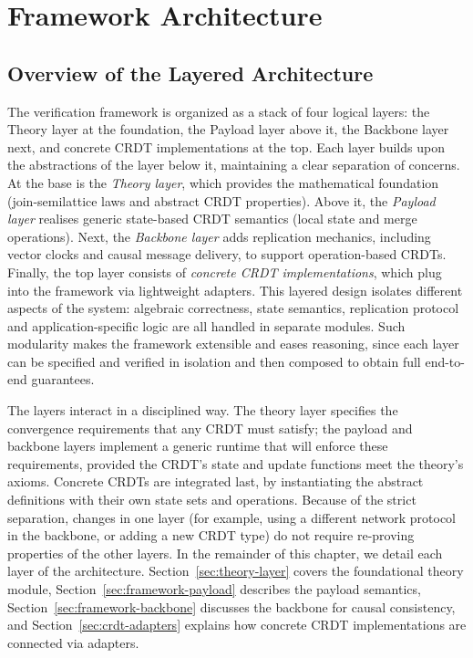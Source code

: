 
\chapter{Framework Architecture}\label{chap:framework}


\section{Overview of the Layered Architecture}

The verification framework is organized as a stack of four logical layers: the Theory layer at the foundation, the Payload layer above it, the Backbone layer next, and concrete CRDT implementations at the top. Each layer builds upon the abstractions of the layer below it, maintaining a clear separation of concerns. At the base is the \emph{Theory layer}, which provides the mathematical foundation (join-semilattice laws and abstract CRDT properties). Above it, the \emph{Payload layer} realises generic state-based CRDT semantics (local state and merge operations). Next, the \emph{Backbone layer} adds replication mechanics, including vector clocks and causal message delivery, to support operation-based CRDTs. Finally, the top layer consists of \emph{concrete CRDT implementations}, which plug into the framework via lightweight adapters. This layered design isolates different aspects of the system: algebraic correctness, state semantics, replication protocol and application-specific logic are all handled in separate modules. Such modularity makes the framework extensible and eases reasoning, since each layer can be specified and verified in isolation and then composed to obtain full end-to-end guarantees.

The layers interact in a disciplined way. The theory layer specifies the convergence requirements that any CRDT must satisfy; the payload and backbone layers implement a generic runtime that will enforce these requirements, provided the CRDT’s state and update functions meet the theory’s axioms. Concrete CRDTs are integrated last, by instantiating the abstract definitions with their own state sets and operations. Because of the strict separation, changes in one layer (for example, using a different network protocol in the backbone, or adding a new CRDT type) do not require re-proving properties of the other layers. In the remainder of this chapter, we detail each layer of the architecture. Section~\ref{sec:theory-layer} covers the foundational theory module, Section~\ref{sec:framework-payload} describes the payload semantics, Section~\ref{sec:framework-backbone} discusses the backbone for causal consistency, and Section~\ref{sec:crdt-adapters} explains how concrete CRDT implementations are connected via adapters.

